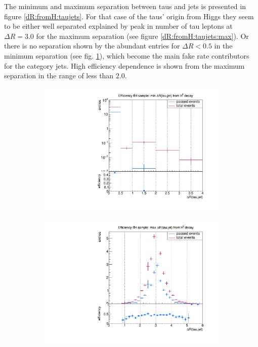 %
The minimum and maximum separation between taus and jets is presented in figure \ref{dR:fromH:taujets}. For that case of the taus' origin from Higgs they seem to be either well separated explained by peak in number of tau leptons at $\Delta R=3.0$ for the maximum separation (see figure \ref{dR:fromH:taujets:max}). Or there is no separation shown by the abundant entries for $\Delta R<0.5$ in the minimum separation (see fig. \ref{dR:fromH:taujets:min}), which become the main fake rate contributors for the category jets. High efficiency dependence is shown from the maximum separation in the range of less than $2.0$.\newline
%
\begin{figure}
  \centering
                \begin{subfigure}[t]{0.49\textwidth}
                \includegraphics[width=\textwidth]{figures/plots/ttH/Divided_fromH_mindR_taujet.pdf}
                \label{dR:fromH:taujets:min}
                \end{subfigure}
                \begin{subfigure}[t]{0.49\textwidth}
                \includegraphics[width=\textwidth]{figures/plots/ttH/Divided_maxdR_fromH_taujet.pdf}

\end{subfigure}
\end{figure}
